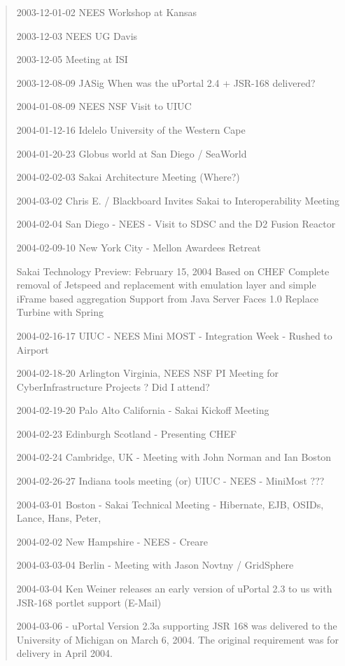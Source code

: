 \begin{quote}
2003-12-01-02 NEES Workshop at Kansas

2003-12-03 NEES UG Davis

2003-12-05 Meeting at ISI

2003-12-08-09 JASig
When was the uPortal 2.4 + JSR-168 delivered?

2004-01-08-09 NEES NSF Visit to UIUC

2004-01-12-16 Idelelo University of the Western Cape

2004-01-20-23 Globus world  at San Diego / SeaWorld

2004-02-02-03 Sakai Architecture Meeting (Where?)

2004-03-02 Chris E. / Blackboard Invites Sakai to Interoperability Meeting

2004-02-04 San Diego - NEES - Visit to SDSC and the D2 Fusion Reactor 

2004-02-09-10 New York City - Mellon Awardees Retreat

Sakai Technology Preview: February 15, 2004
Based on CHEF
Complete removal of Jetspeed and replacement with emulation layer and simple iFrame based aggregation
Support from Java Server Faces 1.0
Replace Turbine with Spring

2004-02-16-17 UIUC - NEES Mini MOST - Integration Week - Rushed to Airport

2004-02-18-20 Arlington Virginia, NEES NSF PI Meeting for CyberInfrastructure Projects ? Did I attend?

2004-02-19-20 Palo Alto California - Sakai Kickoff Meeting

2004-02-23 Edinburgh Scotland - Presenting CHEF

2004-02-24 Cambridge, UK - Meeting with John Norman and Ian Boston

2004-02-26-27 Indiana tools meeting (or) UIUC - NEES - MiniMost ???

2004-03-01 Boston - Sakai Technical Meeting - Hibernate, EJB, OSIDs, Lance, Hans, Peter, 

2004-02-02 New Hampshire - NEES -  Creare

2004-03-03-04 Berlin - Meeting with Jason Novtny / GridSphere

2004-03-04 Ken Weiner releases an early version of uPortal 2.3 
to us with JSR-168 portlet support (E-Mail)

2004-03-06 - uPortal Version 2.3a supporting JSR 168 was delivered to the University of Michigan on March 6, 2004. The original requirement was for delivery in April 2004.


\end{quote}
